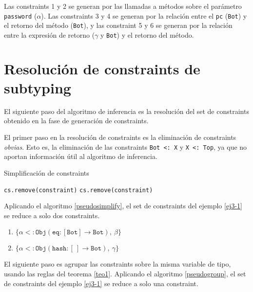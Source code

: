 Las constraints 1 y 2 se generan por las llamadas a métodos sobre el parámetro \texttt{password} ($\alpha$). Las constraints 3 y 4 se generan por la relación entre el \texttt{pc} (\texttt{Bot}) y el retorno del método (\texttt{Bot}), y las constraint 5 y 6 se generan por la relación entre la expresión de retorno ($\gamma$ y \texttt{Bot}) y el retorno del método.

\clearpage %

\section{Resolución de constraints de subtyping} \label{propuestaRes}

El siguiente paso del algoritmo de inferencia es la resolución del set de constraints obtenido en la fase de generación de constraints.

El primer paso en la resolución de constraints es la eliminación de constraints \textit{obvias}. Esto es, la eliminación de las constraints \texttt{Bot <: X} y \texttt{X <: Top}, ya que no aportan información útil al algoritmo de inferencia.

\begin{algorithm}\captionsetup{labelsep=newline}
  \centering
  \caption{Simplificación de constraints}
  \label{pseudosimplify}
    \begin{algorithmic}[1]
              \State \texttt{cs.remove(constraint)}
              \State \texttt{cs.remove(constraint)}
            \EndIf
          \EndFor
      \EndFunction
    \end{algorithmic}
\end{algorithm}

Aplicando el algoritmo \ref{pseudosimplify}, el set de constraints del ejemplo \ref{ej3-1} se reduce a solo dos constraints.

\begin{enumerate}
  \item $\mathtt{\{\alpha <: Obj(eq : [Bot] \rightarrow Bot),\ \beta\}}$
  \item $\mathtt{\{\alpha <: Obj(hash : [\ ] \rightarrow Bot),\ \gamma\}}$
\end{enumerate}

El siguiente paso es agrupar las constraints sobre la misma variable de tipo, usando las reglas del teorema \ref{teo1}. Aplicando el algoritmo \ref{pseudogroup}, el set de constraints del ejemplo \ref{ej3-1} se reduce a solo una constraint.

